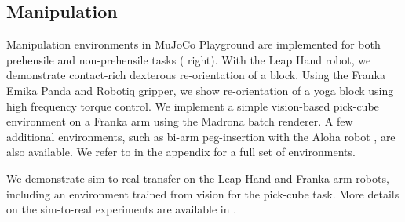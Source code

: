\subsection{Manipulation}

Manipulation environments in MuJoCo Playground are implemented for both prehensile and non-prehensile tasks ( right). With the Leap Hand \cite{shaw2023leaphand} robot, we demonstrate contact-rich dexterous re-orientation of a block. Using the Franka Emika Panda and Robotiq gripper, we show re-orientation of a yoga block using high frequency torque control. We implement a simple vision-based pick-cube environment on a Franka arm using the Madrona batch renderer. A few additional environments, such as bi-arm peg-insertion with the Aloha robot \cite{aldaco2024aloha}, are also available. We refer to  in the appendix for a full set of environments.

We demonstrate sim-to-real transfer on the Leap Hand and Franka arm robots, including an environment trained from vision for the pick-cube task. More details on the sim-to-real experiments are available in .
